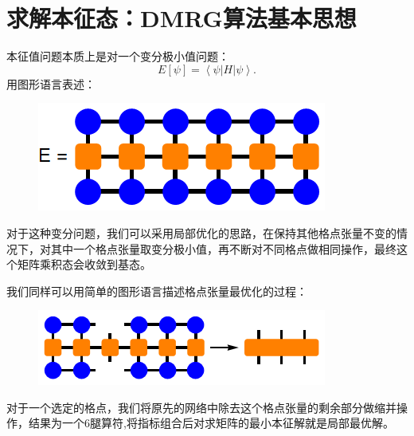\documentclass[UTF8]{ctexart}
\begin{document}
\section*{求解本征态：DMRG算法基本思想}
\noindent 本征值问题本质上是对一个变分极小值问题：
\begin{equation}
	E\left[\psi\right]=\left\langle \psi\right|H\left|\psi\right\rangle.
\end{equation}
用图形语言表述：
\begin{figure}[H]
\begin{centering}
\includegraphics[width=0.4\linewidth]{include/p14}
\par\end{centering}
\end{figure}
\noindent 对于这种变分问题，我们可以采用局部优化的思路，在保持其他格点张量不变的情况下，对其中一个格点张量取变分极小值，再不断对不同格点做相同操作，最终这个矩阵乘积态会收敛到基态。

我们同样可以用简单的图形语言描述格点张量最优化的过程：
\begin{figure}[H]
\begin{centering}
\includegraphics[width=0.6\linewidth]{include/p15}
\par\end{centering}
\end{figure}
\noindent 对于一个选定的格点，我们将原先的网络中除去这个格点张量的剩余部分做缩并操作，结果为一个6腿算符,将指标组合后对求矩阵的最小本征解就是局部最优解。
\end{document}

